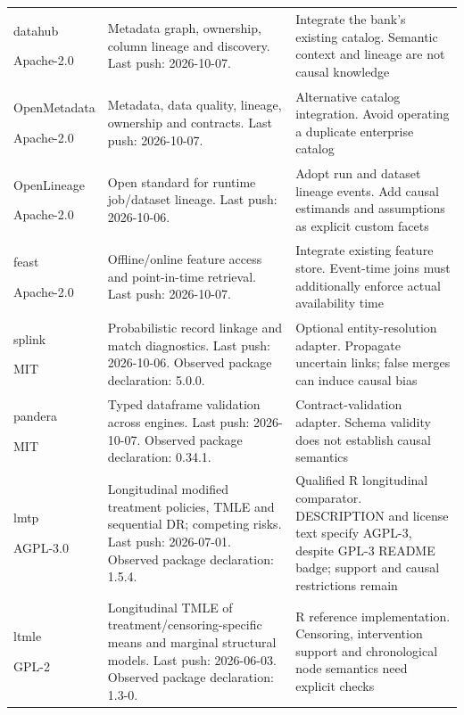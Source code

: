 \begin{longtable}{P{29mm}P{55mm}P{60mm}}
datahub \citep{sw_datahub}\par Apache-2.0 & Metadata graph, ownership, column lineage and discovery. Last push: 2026-10-07. & Integrate the bank's existing catalog. Semantic context and lineage are not causal knowledge\\
OpenMetadata \citep{sw_openmetadata}\par Apache-2.0 & Metadata, data quality, lineage, ownership and contracts. Last push: 2026-10-07. & Alternative catalog integration. Avoid operating a duplicate enterprise catalog\\
OpenLineage \citep{sw_openlineage}\par Apache-2.0 & Open standard for runtime job/dataset lineage. Last push: 2026-10-06. & Adopt run and dataset lineage events. Add causal estimands and assumptions as explicit custom facets\\
feast \citep{sw_feast}\par Apache-2.0 & Offline/online feature access and point-in-time retrieval. Last push: 2026-10-07. & Integrate existing feature store. Event-time joins must additionally enforce actual availability time\\
splink \citep{sw_splink}\par MIT & Probabilistic record linkage and match diagnostics. Last push: 2026-10-06. Observed package declaration: 5.0.0. & Optional entity-resolution adapter. Propagate uncertain links; false merges can induce causal bias\\
pandera \citep{sw_pandera}\par MIT & Typed dataframe validation across engines. Last push: 2026-10-07. Observed package declaration: 0.34.1. & Contract-validation adapter. Schema validity does not establish causal semantics\\
lmtp \citep{sw_lmtp}\par AGPL-3.0 & Longitudinal modified treatment policies, TMLE and sequential DR; competing risks. Last push: 2026-07-01. Observed package declaration: 1.5.4. & Qualified R longitudinal comparator. DESCRIPTION and license text specify AGPL-3, despite GPL-3 README badge; support and causal restrictions remain\\
ltmle \citep{sw_ltmle}\par GPL-2 & Longitudinal TMLE of treatment/censoring-specific means and marginal structural models. Last push: 2026-06-03. Observed package declaration: 1.3-0. & R reference implementation. Censoring, intervention support and chronological node semantics need explicit checks\\

\end{longtable}
